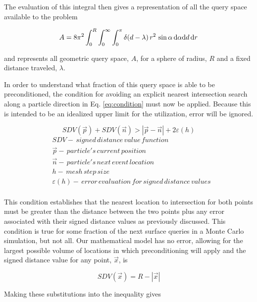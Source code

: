 The evaluation of this integral then gives a representation of all the query
space available to the problem

\begin{equation}
  \label{eq:A_fixed}
\small A = 8\pi^2  \int_{0}^{R}\int_{0}^{\infty}\int_{0}^{\pi} \delta(d-\lambda) \,
r^2 \, \sin{\alpha} \, \mathrm{d}\alpha \mathrm{d}d \, \mathrm{d}r
\end{equation}

and represents all geometric query space, $A$, for a sphere of radius,
$R$ and a fixed distance traveled, $\lambda$.

In order to understand what fraction of this query space is able to be
preconditioned, the condition for avoiding an explicit nearest intersection
search along a particle direction in Eq. \ref{eq:condition} must now be
applied. Because this is intended to be an idealized upper limit for the
utilization, error will be ignored.

\begin{equation}
  SDV(\vec{p}) + SDV(\vec{n}) > |\vec{p}-\vec{n}| + 2\varepsilon(h)
  \label{eq:condition}
\end{equation}
\begin{align*}
 &SDV - \, signed \, distance \, value \, function \\
 &\vec{p} - \, particle's \, current \, position \\
 &\vec{n} - \, particle's \, next \, event \, location \\
 &h - \, mesh \, step \, size \\
 &\varepsilon(h) - \, error \, evaluation \, for \, signed \, distance \, values \\
\end{align*}

This condition establishes that the nearest location to intersection for both
points must be greater than the distance between the two points plus any error
associated with their signed distance values as previously discussed. This
condition is true for some fraction of the next surface queries in a Monte Carlo
simulation, but not all.  Our mathematical model has no error, allowing for the
largest possible volume of locations in which preconditioning will apply and the
signed distance value for any point, $\vec{x}$, is

\begin{equation}
SDV(\vec{x}) =  R-|\vec{x}|
\end{equation}

Making these substitutions into the inequality gives


